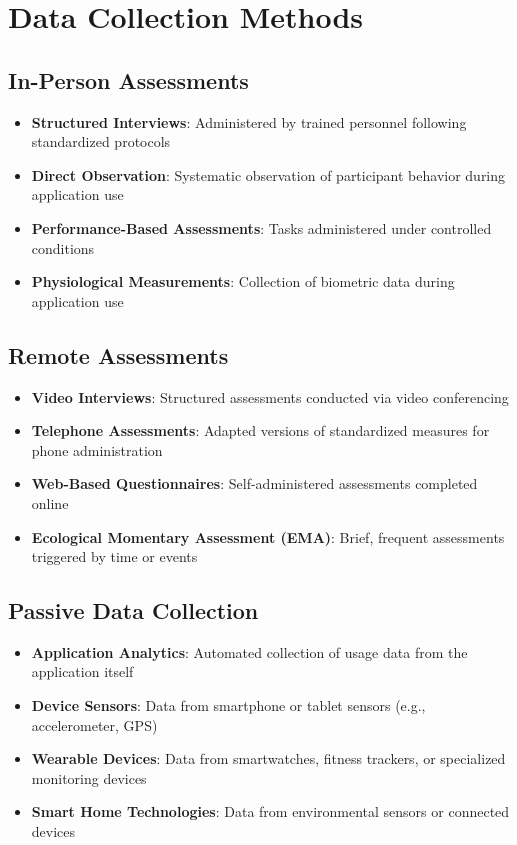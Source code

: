 \section{Data Collection Methods}
\subsection{In-Person Assessments}
\begin{itemize}
    \item \textbf{Structured Interviews}: Administered by trained personnel following standardized protocols
    
    \item \textbf{Direct Observation}: Systematic observation of participant behavior during application use
    
    \item \textbf{Performance-Based Assessments}: Tasks administered under controlled conditions
    
    \item \textbf{Physiological Measurements}: Collection of biometric data during application use
\end{itemize}

\subsection{Remote Assessments}
\begin{itemize}
    \item \textbf{Video Interviews}: Structured assessments conducted via video conferencing
    
    \item \textbf{Telephone Assessments}: Adapted versions of standardized measures for phone administration
    
    \item \textbf{Web-Based Questionnaires}: Self-administered assessments completed online
    
    \item \textbf{Ecological Momentary Assessment (EMA)}: Brief, frequent assessments triggered by time or events
\end{itemize}

\subsection{Passive Data Collection}
\begin{itemize}
    \item \textbf{Application Analytics}: Automated collection of usage data from the application itself
    
    \item \textbf{Device Sensors}: Data from smartphone or tablet sensors (e.g., accelerometer, GPS)
    
    \item \textbf{Wearable Devices}: Data from smartwatches, fitness trackers, or specialized monitoring devices
    
    \item \textbf{Smart Home Technologies}: Data from environmental sensors or connected devices
\end{itemize}

